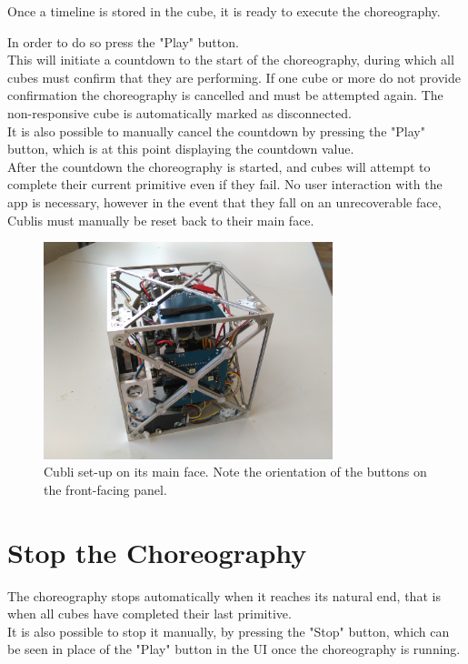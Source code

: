 Once a timeline is stored in the cube, it is ready to execute the choreography. 

In order to do so press the "Play" button.\\

This will initiate a countdown to the start of the choreography, during which all cubes must confirm that they are performing. If one cube or more do not provide confirmation the choreography is cancelled and must be attempted again. The non-responsive cube is automatically marked as disconnected.\\

It is also possible to manually cancel the countdown by pressing the "Play" button, which is at this point displaying the countdown value.\\

After the countdown the choreography is started, and cubes will attempt to complete their current primitive even if they fail. No user interaction with the app is necessary, however in the event that they fall on an unrecoverable face, Cublis must manually be reset back to their main face.

\begin{figure}[ht]
   \centering
   \includegraphics[width=0.75\textwidth]{img/MainFace.jpg}
   \caption{Cubli set-up on its main face. Note the orientation of the buttons on the front-facing panel.}
   \label{img:MainFace}
\end{figure}


\section{Stop the Choreography}

The choreography stops automatically when it reaches its natural end, that is when all cubes have completed their last primitive. \\

It is also possible to stop it manually, by pressing the "Stop" button, which can be seen in place of the "Play" button in the UI once the choreography is running.